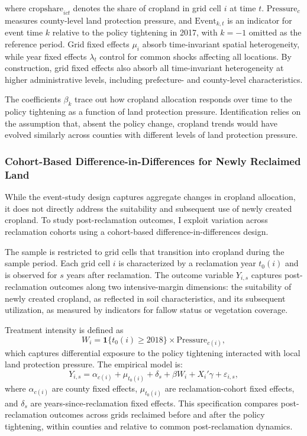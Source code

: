 where $\text{cropshare}_{ict}$ denotes the share of cropland in grid cell $i$ at time $t$. $\text{Pressure}_{c}$ measures county-level land protection pressure, and $\text{Event}_{k,t}$ is an indicator for event time $k$ relative to the policy tightening in 2017, with $k=-1$ omitted as the reference period. Grid fixed effects $\mu_i$ absorb time-invariant spatial heterogeneity, while year fixed effects $\lambda_t$ control for common shocks affecting all locations. By construction, grid fixed effects also absorb all time-invariant heterogeneity at higher administrative levels, including prefecture- and county-level characteristics.


The coefficients $\beta_k$ trace out how cropland allocation responds over time to the policy tightening as a function of land protection pressure. Identification relies on the assumption that, absent the policy change, cropland trends would have evolved similarly across counties with different levels of land protection pressure.

\subsubsection{Cohort-Based Difference-in-Differences for Newly Reclaimed Land}

While the event-study design captures aggregate changes in cropland allocation, it does not directly address the suitability and subsequent use of newly created cropland. To study post-reclamation outcomes, I exploit variation across reclamation cohorts using a cohort-based difference-in-differences design.

The sample is restricted to grid cells that transition into cropland during the sample period. Each grid cell $i$ is characterized by a reclamation year $t_0(i)$ and is observed for $s$ years after reclamation. The outcome variable $Y_{i,s}$ captures post-reclamation outcomes along two intensive-margin dimensions: the suitability of newly created cropland, as reflected in soil characteristics, and its subsequent utilization, as measured by indicators for fallow status or vegetation coverage.

Treatment intensity is defined as
\begin{equation}
    W_i = \mathbf{1}\{t_0(i) \geq 2018\} \times \text{Pressure}_{c(i)},
\end{equation}
which captures differential exposure to the policy tightening interacted with local land protection pressure. The empirical model is:
\begin{equation}
    Y_{i,s}
    =
    \alpha_{c(i)} 
    + 
    \mu_{t_0(i)}
    +
    \delta_s
    +
    \beta W_i
    +
    X_i'\gamma
    +
    \varepsilon_{i,s},
    \label{mod_cohort}
\end{equation}
where $\alpha_{c(i)}$ are county fixed effects, $\mu_{t_0(i)}$ are reclamation-cohort fixed effects, and $\delta_s$ are years-since-reclamation fixed effects. This specification compares post-reclamation outcomes across grids reclaimed before and after the policy tightening, within counties and relative to common post-reclamation dynamics.


